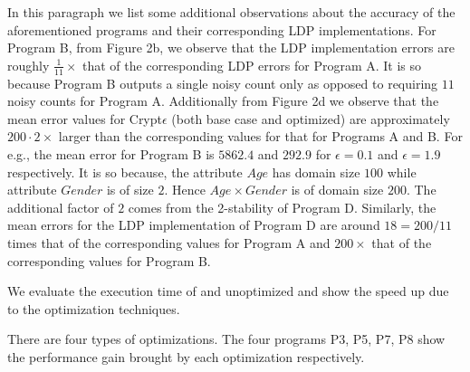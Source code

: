 {In this paragraph we list some additional observations about the accuracy of the aforementioned \system programs and their corresponding \textsf{LDP} implementations.  For Program B, from Figure 2b, we observe that the \textsf{LDP} implementation errors  are roughly $\frac{1}{11}\times$ that of the corresponding \textsf{LDP} errors for Program A. It is so because Program B outputs a single noisy count only as opposed to requiring $11$ noisy counts for Program A. Additionally from Figure 2d we observe that the mean error values for Crypt$\epsilon$ (both base case and optimized) are approximately $200\cdot 2 \times $ larger than the corresponding values for that for Programs A and B. For e.g., the mean error for Program B is $5862.4$ and $292.9$ for $\epsilon=0.1$ and $\epsilon=1.9$ respectively. It is so because, the attribute $Age$ has domain size $100$ while attribute $Gender$ is of size $2$. Hence $Age\times Gender$ is of domain size $200$. The additional factor of $2$ comes from the 2-stability of Program D. Similarly, the mean errors for the \textsf{LDP} implementation of Program D are around $18 = 200/11$ times that of the corresponding values for Program A and $200\times$ that of the corresponding values for Program B.
}


 We evaluate the execution time of \system and unoptimized \system and show the speed up due to the optimization techniques.

There are four types of optimizations. The four programs P3, P5, P7, P8 show the performance gain brought by each optimization respectively.



